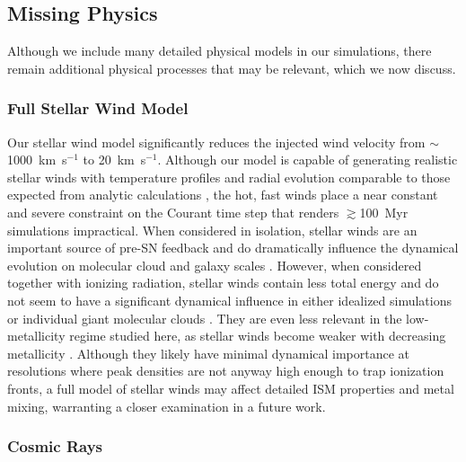 \documentclass[twocolumn]{aastex61}
\begin{document}
\subsection{Missing Physics}
Although we include many detailed physical models in our simulations, there remain additional physical processes that may be relevant, which we now discuss.

\subsubsection{Full Stellar Wind Model}
\label{sec:stellar winds discussion}
Our stellar wind model significantly reduces the injected wind velocity from $\sim$1000~km~s$^{-1}$ to 20~km~s$^{-1}$. Although our model is capable of generating realistic stellar winds with temperature profiles and radial evolution comparable to those expected from analytic calculations \citep{Weaver1977}, the hot, fast winds place a near constant and severe constraint on the Courant time step that renders $\gtrsim$100~Myr simulations impractical. When considered in isolation, stellar winds are an important source of pre-SN feedback and do dramatically influence the dynamical evolution on molecular cloud and galaxy scales \citep{Dale2008,Peters2017,Gatto2017}. However, when considered together with ionizing radiation, stellar winds contain less total energy \citep{Agertz2013} and do not seem to have a significant dynamical influence in either idealized simulations \citep{Geen2015} or  individual giant molecular clouds \citep{Dale2014}. They are even less relevant in the low-metallicity regime studied here, as stellar winds become weaker with decreasing metallicity \citep{Puls2000, Vink2005}. Although they likely have minimal dynamical importance at resolutions where peak densities are not anyway high enough to trap ionization fronts, a full model of stellar winds may affect detailed ISM properties and metal mixing, warranting a closer examination in a future work.


\subsubsection{Cosmic Rays} 
\end{document}
